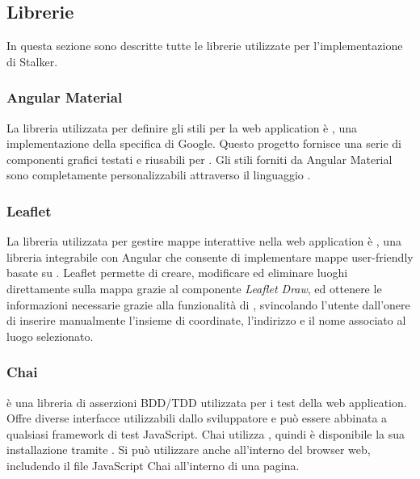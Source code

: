 \documentclass[../../manuale-manutentore.tex]{subfiles}
\begin{document}
\subsection{Librerie}%
\label{sub:librerie}
In questa sezione sono descritte tutte le librerie utilizzate per l'implementazione di Stalker.


\subsubsection{Angular Material}%
\label{subs:angular_material}

La libreria utilizzata per definire gli stili per la web application è , una implementazione della specifica  di Google.
Questo progetto fornisce una serie di componenti grafici testati e riusabili per \@.
Gli stili forniti da Angular Material sono completamente personalizzabili attraverso il linguaggio .

\subsubsection{Leaflet}%
\label{subs:leaflet}

La libreria utilizzata per gestire mappe interattive nella web application è , una libreria integrabile con Angular che consente di implementare mappe user-friendly basate su .
Leaflet permette di creare, modificare ed eliminare luoghi direttamente sulla mappa grazie al componente \textit{Leaflet Draw}, ed ottenere le informazioni necessarie grazie alla funzionalità di , svincolando l'utente dall'onere di inserire manualmente l'insieme di coordinate, l'indirizzo e il nome associato al luogo selezionato.

\subsubsection{Chai}%
\label{subs:chai}

 è una libreria di asserzioni BDD/TDD utilizzata per i test della web application.
Offre diverse interfacce utilizzabili dallo sviluppatore e può essere abbinata a qualsiasi framework di test JavaScript.
Chai utilizza , quindi è disponibile la sua installazione tramite .
Si può utilizzare anche all'interno del browser web, includendo il file JavaScript Chai all'interno di una pagina.
\end{document}
